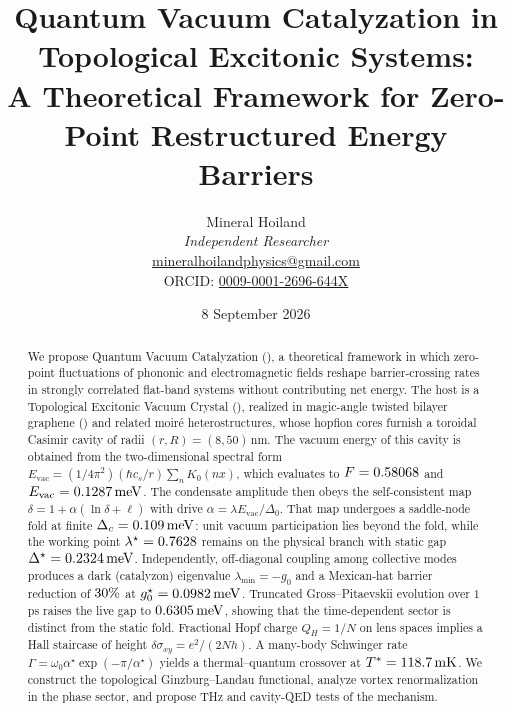 \documentclass[11pt,letterpaper]{article}
\begin{document}
\title{\textbf{Quantum Vacuum Catalyzation in Topological Excitonic Systems:}\\
\large A Theoretical Framework for Zero-Point Restructured Energy Barriers}

\author{Mineral Hoiland\\
\textit{Independent Researcher}\\
\href{mailto:mineralhoilandphysics@gmail.com}{mineralhoilandphysics@gmail.com}\\
ORCID: \href{https://orcid.org/0009-0001-2696-644X}{0009-0001-2696-644X}}

\date{8 September 2026}

\maketitle
\begin{abstract}
We propose Quantum Vacuum Catalyzation (\QVC), a theoretical framework in which zero-point fluctuations of phononic and electromagnetic fields reshape barrier-crossing rates in strongly correlated flat-band systems without contributing net energy. The host is a Topological Excitonic Vacuum Crystal (\TEVC), realized in magic-angle twisted bilayer graphene (\MATBG) and related moir\'e heterostructures, whose hopfion cores furnish a toroidal Casimir cavity of radii $(r,R)=(8,50)$\,nm. The vacuum energy of this cavity is obtained from the two-dimensional spectral form $E_{\mathrm{vac}}=(1/4\pi^2)(\hbar c_s/r)\sum_n K_0(nx)$, which evaluates to $F=0.58068$ and $E_{\mathrm{vac}}=0.1287\,\mathrm{meV}$. The condensate amplitude then obeys the self-consistent map $\delta=1+\alpha(\ln\delta+\ell)$ with drive $\alpha=\lambda E_{\mathrm{vac}}/\Delta_0$. That map undergoes a saddle-node fold at finite $\Delta_c=0.109\,\mathrm{meV}$: unit vacuum participation lies beyond the fold, while the working point $\lambda^\star=0.7628$ remains on the physical branch with static gap $\Delta^\star=0.2324\,\mathrm{meV}$. Independently, off-diagonal coupling among collective modes produces a dark (catalyzon) eigenvalue $\lambda_{\min}=-g_0$ and a Mexican-hat barrier reduction of $30\%$ at $g_0^\star=0.0982\,\mathrm{meV}$. Truncated Gross--Pitaevskii evolution over $1$\,ps raises the live gap to $0.6305\,\mathrm{meV}$, showing that the time-dependent sector is distinct from the static fold. Fractional Hopf charge $Q_H=1/N$ on lens spaces implies a Hall staircase of height $\delta\sigma_{xy}=e^2/(2Nh)$. A many-body Schwinger rate $\Gamma=\omega_0\alpha^\star\exp(-\pi/\alpha^\star)$ yields a thermal--quantum crossover at $T^*=118.7\,\mathrm{mK}$. We construct the topological Ginzburg--Landau functional, analyze vortex renormalization in the phase sector, and propose THz and cavity-QED tests of the mechanism.
\end{abstract}
\end{document}
